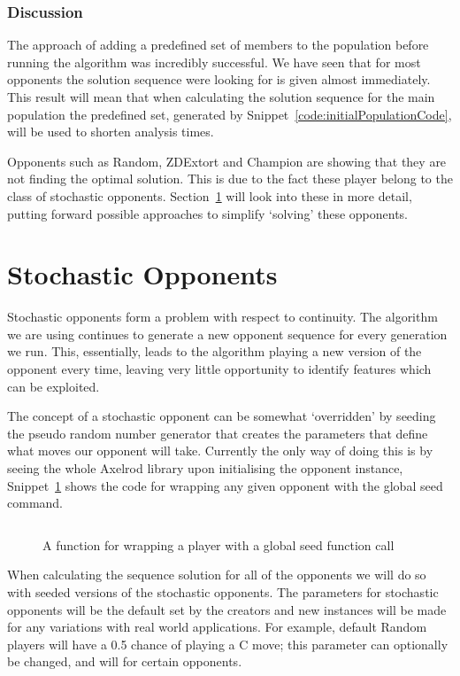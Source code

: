 \subsubsection{Discussion}\label{subsubsec:discussion}
The approach of adding a predefined set of members to the population before running the algorithm was incredibly successful.
We have seen that for most opponents the solution sequence were looking for is given almost immediately.
This result will mean that when calculating the solution sequence for the main population the predefined set, generated by Snippet~\ref{code:initialPopulationCode}, will be used to shorten analysis times.

Opponents such as Random, ZDExtort and Champion are showing that they are not finding the optimal solution.
This is due to the fact these player belong to the class of stochastic opponents.
Section~\ref{sec:stochasticOpponents} will look into these in more detail, putting forward possible approaches to simplify `solving' these opponents.

\section{Stochastic Opponents}\label{sec:stochasticOpponents}
Stochastic opponents form a problem with respect to continuity.
The algorithm we are using continues to generate a new opponent sequence for every generation we run.
This, essentially, leads to the algorithm playing a new version of the opponent every time, leaving very little opportunity to identify features which can be exploited.

The concept of a stochastic opponent can be somewhat `overridden' by seeding the pseudo random number generator that creates the parameters that define what moves our opponent will take.
Currently the only way of doing this is by seeing the whole Axelrod library upon initialising the opponent instance, Snippet~\ref{code:wrappingFunction} shows the code for wrapping any given opponent with the global seed command.

\begin{figure}
    \inputminted{python}{code_snippets/classWrappingFunction.py}
    \caption{A function for wrapping a player with a global seed function call}\label{code:wrappingFunction}
\end{figure}

When calculating the sequence solution for all of the opponents we will do so with seeded versions of the stochastic opponents.
The parameters for stochastic opponents will be the default set by the creators and new instances will be made for any variations with real world applications.
For example, default Random players will have a 0.5 chance of playing a C move;
this parameter can optionally be changed, and will for certain opponents.

